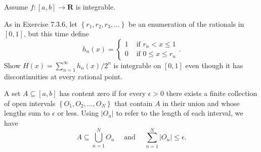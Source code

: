\begin{exercise} Assume $f:[a, b] \rightarrow \mathbf{R}$ is integrable.
\end{exercise}
\begin{solution}
    \TODO
\end{solution}

\begin{exercise} As in Exercise 7.3.6, let $\left\{r_{1}, r_{2}, r_{3}, \ldots\right\}$ be an enumeration of the rationals in $[0,1]$, but this time define
$$
h_{n}(x)=\left\{\begin{array}{ll}
1 & \text { if } r_{n}<x \leq 1 \\
0 & \text { if } 0 \leq x \leq r_{n}
\end{array} .\right.
$$
Show $H(x)=\sum_{n=1}^{\infty} h_{n}(x) / 2^{n}$ is integrable on $[0,1]$ even though it has discontinuities at every rational point.
\end{exercise}
\begin{solution}
    \TODO
\end{solution}

\begin{exercise} A set $A \subseteq[a, b]$ has content zero if for every $\epsilon>0$ there exists a finite collection of open intervals $\left\{O_{1}, O_{2}, \ldots, O_{N}\right\}$ that contain $A$ in their union and whose lengths sum to $\epsilon$ or less. Using $\left|O_{n}\right|$ to refer to the length of each interval, we have
$$
A \subseteq \bigcup_{n=1}^{N} O_{n} \quad \text { and } \quad \sum_{n=1}^{N}\left|O_{n}\right| \leq \epsilon .
$$
\end{exercise}
\begin{solution}
    \TODO
\end{solution}
